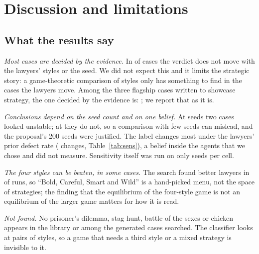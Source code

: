 \section{Discussion and limitations}\label{sec:discussion}

\subsection{What the results say}
\emph{Most cases are decided by the evidence.} In \NEvidence{} of \NCases{} cases the verdict does not move with the lawyers' styles or the seed. We did not expect this and it limits the strategic story: a game-theoretic comparison of styles only has something to find in the \NMove{} cases the lawyers move. Among the three flagship cases written to showcase strategy, the one decided by the evidence is: \FlagshipEvidence{}; we report that as it is.

\emph{Conclusions depend on the seed count and on one belief.} At \BootOldSeeds{} seeds two cases looked unstable; at \BootSeeds{} they do not, so a comparison with few seeds can mislead, and the proposal's 200 seeds were justified. The label changes most under the lawyers' prior defect rate (\SensPriorChanges{} changes, Table~\ref{tab:sens}), a belief inside the agents that we chose and did not measure. Sensitivity itself was run on only \SensSeeds{} seeds per cell.

\emph{The four styles can be beaten, in some cases.} The search found better lawyers in \NBeaten{} of \NSearches{} runs, so ``Bold, Careful, Smart and Wild'' is a hand-picked menu, not the space of strategies; the finding that the equilibrium of the four-style game is not an equilibrium of the larger game matters for how it is read.

\emph{Not found.} No prisoner's dilemma, stag hunt, battle of the sexes or chicken appears in the library or among the generated cases searched. The classifier looks at pairs of styles, so a game that needs a third style or a mixed strategy is invisible to it.

